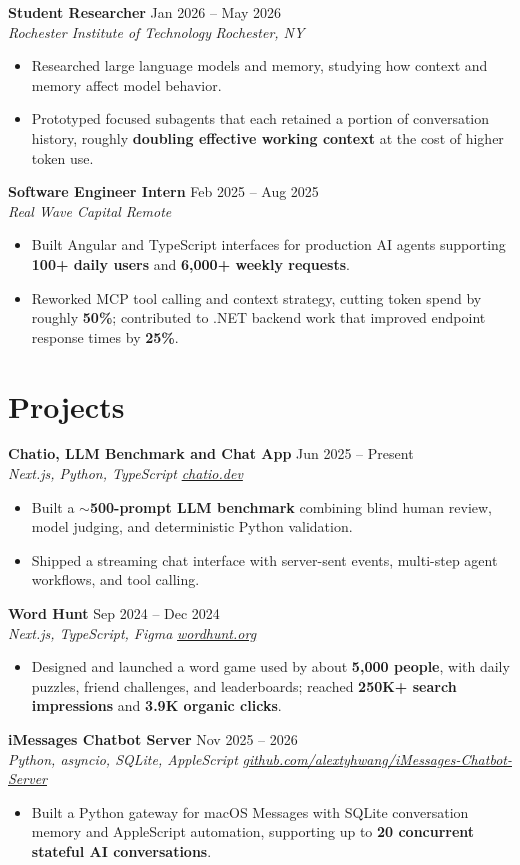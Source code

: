 \documentclass[10pt,letterpaper]{article}
\newif\ifresumeFirstRole
\newcommand{\resumeRole}[4]{%
  \ifresumeFirstRole
    \global\resumeFirstRolefalse
  \else
    \vspace{2pt}%
  \fi
  \textbf{#1} \hfill #2\\
  \textit{#3} \hfill \textit{#4}
}
\begin{document}
\resumeRole{Student Researcher}{Jan 2026 -- May 2026}{Rochester Institute of Technology}{Rochester, NY}
\begin{itemize}
  \item Researched large language models and memory, studying how context and memory affect model behavior.
  \item Prototyped focused subagents that each retained a portion of conversation history, roughly \textbf{doubling effective working context} at the cost of higher token use.
\end{itemize}

\resumeRole{Software Engineer Intern}{Feb 2025 -- Aug 2025}{Real Wave Capital}{Remote}
\begin{itemize}
  \item Built Angular and TypeScript interfaces for production AI agents supporting \textbf{100+ daily users} and \textbf{6,000+ weekly requests}.
  \item Reworked MCP tool calling and context strategy, cutting token spend by roughly \textbf{50\%}; contributed to .NET backend work that improved endpoint response times by \textbf{25\%}.
\end{itemize}

\section*{Projects}
\resumeRole{Chatio, LLM Benchmark and Chat App}{Jun 2025 -- Present}{Next.js, Python, TypeScript}{\href{https://chatio.dev}{chatio.dev}}
\begin{itemize}
  \item Built a \textbf{${\sim}$500-prompt LLM benchmark} combining blind human review, model judging, and deterministic Python validation.
  \item Shipped a streaming chat interface with server-sent events, multi-step agent workflows, and tool calling.
\end{itemize}

\resumeRole{Word Hunt}{Sep 2024 -- Dec 2024}{Next.js, TypeScript, Figma}{\href{https://wordhunt.org}{wordhunt.org}}
\begin{itemize}
  \item Designed and launched a word game used by about \textbf{5,000 people}, with daily puzzles, friend challenges, and leaderboards; reached \textbf{250K+ search impressions} and \textbf{3.9K organic clicks}.
\end{itemize}

\resumeRole{iMessages Chatbot Server}{Nov 2025 -- 2026}{Python, asyncio, SQLite, AppleScript}{\href{https://github.com/alextyhwang/iMessages-Chatbot-Server}{github.com/alextyhwang/iMessages-Chatbot-Server}}
\begin{itemize}
  \item Built a Python gateway for macOS Messages with SQLite conversation memory and AppleScript automation, supporting up to \textbf{20 concurrent stateful AI conversations}.
\end{itemize}
\end{document}
